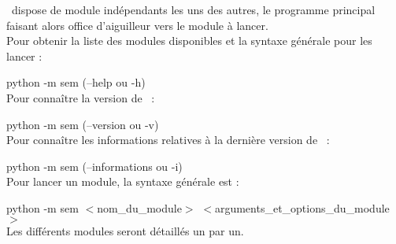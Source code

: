 \documentclass[manual-fr.tex]{subfiles}
\begin{document}
\SEM\ dispose de module indépendants les uns des autres, le programme principal faisant alors office d'aiguilleur vers le module à lancer.\\

Pour obtenir la liste des modules disponibles et la syntaxe générale pour les lancer :

python -m sem (--help ou -h)\\

Pour connaître la version de \SEM\ :

python -m sem (--version ou -v)\\

Pour connaître les informations relatives à la dernière version de \SEM\ :

python -m sem (--informations ou -i)\\

Pour lancer un module, la syntaxe générale est :

python -m sem $<$nom\_du\_module$>$ $<$arguments\_et\_options\_du\_module$>$\\

Les différents modules seront détaillés un par un.
\end{document}
